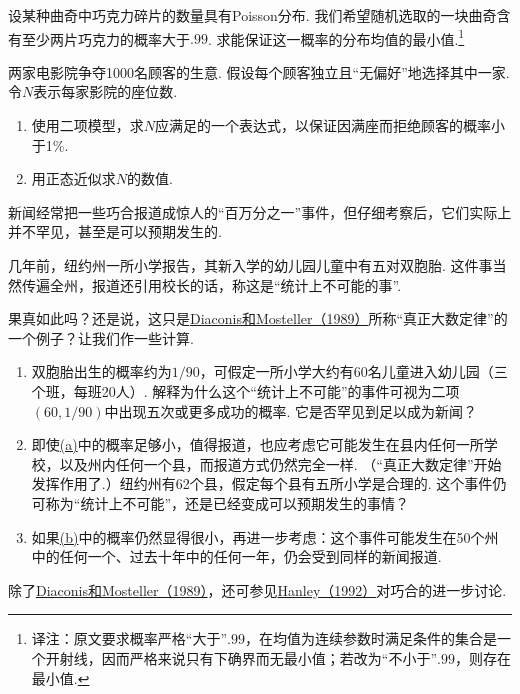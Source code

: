 \begin{exercise}\label{exercise:3.7}
设某种曲奇中巧克力碎片的数量具有Poisson分布. 我们希望随机选取的一块曲奇含有至少两片巧克力的概率大于$.99$. 求能保证这一概率的分布均值的最小值.\footnote{译注：原文要求概率严格“大于”$.99$，在均值为连续参数时满足条件的集合是一个开射线，因而严格来说只有下确界而无最小值；若改为“不小于”$.99$，则存在最小值.}
\end{exercise}
\begin{exercise}\label{exercise:3.8}
两家电影院争夺1000名顾客的生意. 假设每个顾客独立且“无偏好”地选择其中一家. 令$N$表示每家影院的座位数.
\begin{enumerate}
\item[(a)] 使用二项模型，求$N$应满足的一个表达式，以保证因满座而拒绝顾客的概率小于1\%.
\item[(b)] 用正态近似求$N$的数值.
\end{enumerate}
\end{exercise}
\begin{exercise}\label{exercise:3.9}
新闻经常把一些巧合报道成惊人的“百万分之一”事件，但仔细考察后，它们实际上并不罕见，甚至是可以预期发生的.

几年前，纽约州一所小学报告，其新入学的幼儿园儿童中有五对双胞胎. 这件事当然传遍全州，报道还引用校长的话，称这是“统计上不可能的事”.

果真如此吗？还是说，这只是\hyperref[bib:source100]{Diaconis和Mosteller（1989）}所称“真正大数定律”的一个例子？让我们作一些计算.
\begin{enumerate}
\item[(a)]\label{itm:exercise:3.9:a} 双胞胎出生的概率约为$1/90$，可假定一所小学大约有60名儿童进入幼儿园（三个班，每班20人）. 解释为什么这个“统计上不可能”的事件可视为二项$(60,1/90)$中出现五次或更多成功的概率. 它是否罕见到足以成为新闻？
\item[(b)]\label{itm:exercise:3.9:b} 即使\hyperref[itm:exercise:3.9:a]{(a)}中的概率足够小，值得报道，也应考虑它可能发生在县内任何一所学校，以及州内任何一个县，而报道方式仍然完全一样. （“真正大数定律”开始发挥作用了.）纽约州有62个县，假定每个县有五所小学是合理的. 这个事件仍可称为“统计上不可能”，还是已经变成可以预期发生的事情？
\item[(c)] 如果\hyperref[itm:exercise:3.9:b]{(b)}中的概率仍然显得很小，再进一步考虑：这个事件可能发生在50个州中的任何一个、过去十年中的任何一年，仍会受到同样的新闻报道.
\end{enumerate}
除了\hyperref[bib:source100]{Diaconis和Mosteller（1989）}，还可参见\hyperref[bib:source157]{Hanley（1992）}对巧合的进一步讨论.
\end{exercise}

